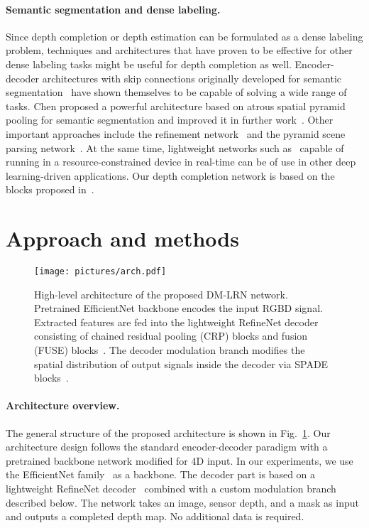 \documentclass[final]{cvpr}
\begin{document}
    \paragraph{Semantic segmentation and dense labeling.}
    
    Since depth completion or depth estimation can be formulated as a dense labeling problem, techniques and architectures that have proven to be effective for other dense labeling tasks might be useful for depth completion as well. Encoder-decoder architectures with skip connections originally developed for semantic segmentation~\cite{unet} have shown themselves to be capable of solving a wide range of tasks. Chen \etal \cite{deeplab} proposed a powerful architecture based on atrous spatial pyramid pooling for semantic segmentation and improved it in further work~\cite{DBLP:journals/corr/ChenPSA17}. Other important approaches include the refinement network~\cite{refinenet} and the pyramid scene parsing network~\cite{pspnet}. At the same time, lightweight networks such as~\cite{lrn-de} capable of running in a resource-constrained device in real-time can be of use in other deep learning-driven applications. Our depth completion network is based on the blocks proposed in~\cite{refinenet, LRN}.

\section{Approach and methods}\label{sec:methods}

    \begin{figure}[t]
    \begin{center}
       \texttt{[image: pictures/arch.pdf]}
    \end{center}
    \caption{High-level architecture of the proposed DM-LRN network. Pretrained EfficientNet \cite{EffitientNet} backbone encodes the input RGBD signal. Extracted features are fed into the lightweight RefineNet decoder~\cite{LRN} consisting of chained residual pooling (CRP) blocks and fusion (FUSE) blocks~\cite{LRN}. The decoder modulation branch modifies the spatial distribution of output signals inside the decoder via SPADE blocks~\cite{spade}.}
    \label{fig:arch}
    \end{figure}
    


    \paragraph{Architecture overview.}
    The general structure of the proposed architecture is shown in Fig.~\ref{fig:arch}. Our architecture design follows the standard encoder-decoder paradigm with a pretrained backbone network modified for 4D input. In our experiments, we use the EfficientNet family~\cite{EffitientNet} as a backbone. The decoder part is based on a lightweight RefineNet decoder~\cite{LRN} combined with a custom modulation branch described below. The network takes an image, sensor depth, and a mask as input and outputs a completed depth map. No additional data is required.
\end{document}
